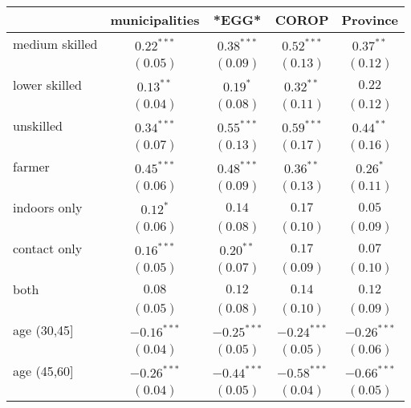 
\begin{table}
\begin{center}
\begin{small}
\begin{tabular}{l c c c c}
\hline
 & municipalities & *EGG* & COROP & Province \\
\hline
medium skilled     & $0.22^{***}$  & $0.38^{***}$  & $0.52^{***}$  & $0.37^{**}$   \\
                   & $(0.05)$      & $(0.09)$      & $(0.13)$      & $(0.12)$      \\
lower skilled      & $0.13^{**}$   & $0.19^{*}$    & $0.32^{**}$   & $0.22$        \\
                   & $(0.04)$      & $(0.08)$      & $(0.11)$      & $(0.12)$      \\
unskilled          & $0.34^{***}$  & $0.55^{***}$  & $0.59^{***}$  & $0.44^{**}$   \\
                   & $(0.07)$      & $(0.13)$      & $(0.17)$      & $(0.16)$      \\
farmer             & $0.45^{***}$  & $0.48^{***}$  & $0.36^{**}$   & $0.26^{*}$    \\
                   & $(0.06)$      & $(0.09)$      & $(0.13)$      & $(0.11)$      \\
indoors only       & $0.12^{*}$    & $0.14$        & $0.17$        & $0.05$        \\
                   & $(0.06)$      & $(0.08)$      & $(0.10)$      & $(0.09)$      \\
contact only       & $0.16^{***}$  & $0.20^{**}$   & $0.17$        & $0.07$        \\
                   & $(0.05)$      & $(0.07)$      & $(0.09)$      & $(0.10)$      \\
both               & $0.08$        & $0.12$        & $0.14$        & $0.12$        \\
                   & $(0.05)$      & $(0.08)$      & $(0.10)$      & $(0.09)$      \\
age (30,45]        & $-0.16^{***}$ & $-0.25^{***}$ & $-0.24^{***}$ & $-0.26^{***}$ \\
                   & $(0.04)$      & $(0.05)$      & $(0.05)$      & $(0.06)$      \\
age (45,60]        & $-0.26^{***}$ & $-0.44^{***}$ & $-0.58^{***}$ & $-0.66^{***}$ \\
                   & $(0.04)$      & $(0.05)$      & $(0.04)$      & $(0.05)$      \\

\end{tabular}
\end{small}
\end{center}
\end{table}
